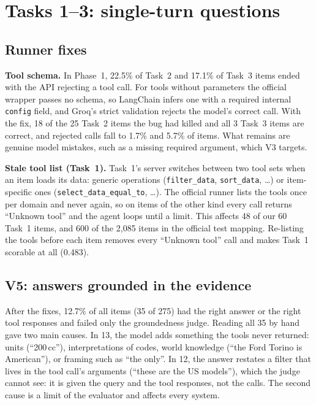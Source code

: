 \documentclass[10pt]{article}
\begin{document}
\section{Tasks 1--3: single-turn questions}

\subsection*{Runner fixes}
\textbf{Tool schema.} In Phase~1, 22.5\% of Task~2 and 17.1\% of Task~3 items ended with the API
rejecting a tool call. For tools without parameters the official wrapper passes no schema, so
LangChain infers one with a required internal \texttt{config} field, and Groq's strict
validation rejects the model's correct call. With the fix, 18 of the 25 Task~2 items the bug had
killed and all 3 Task~3 items are correct, and rejected calls fall to 1.7\% and 5.7\% of items.
What remains are genuine model mistakes, such as a missing required argument, which V3 targets.

\textbf{Stale tool list (Task~1).} Task~1's server switches between two tool sets when an item
loads its data: generic operations (\texttt{filter\_data}, \texttt{sort\_data}, \ldots) or
item-specific ones (\texttt{select\_data\_equal\_to}, \ldots). The official runner lists the
tools once per domain and never again, so on items of the other kind every call returns
``Unknown tool'' and the agent loops until a limit. This affects 48 of our 60 Task~1 items, and
600 of the 2,085 items in the official test mapping. Re-listing the tools before each item
removes every ``Unknown tool'' call and makes Task~1 scorable at all (0.483).

\subsection*{V5: answers grounded in the evidence}
After the fixes, 12.7\% of all items (35 of 275) had the right answer or the right tool responses
and failed only the groundedness judge. Reading all 35 by hand gave two main causes. In 13, the
model adds something the tools never returned: units (``200\,cc''), interpretations of codes,
world knowledge (``the Ford Torino is American''), or framing such as ``the only''. In 12, the
answer restates a filter that lives in the tool call's arguments (``these are the US models''),
which the judge cannot see: it is given the query and the tool responses, not the calls. The
second cause is a limit of the evaluator and affects every system.
\end{document}
